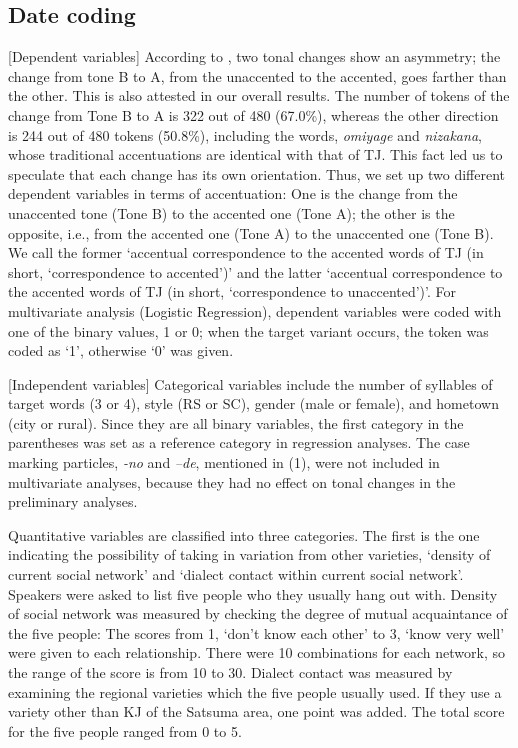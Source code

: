 \documentclass[output=paper]{LSP/langsci}
\begin{document}
\subsection{Date coding}
[Dependent variables] According to \citet{kubozono_tonal_2007}, two tonal changes show an asymmetry; the change from tone B to A, from the unaccented to the accented, goes farther than the other. This is also attested in our overall results. The number of tokens of the change from Tone B to A is 322 out of 480 (67.0\%), whereas the other direction is 244 out of 480 tokens (50.8\%), including the words, \textit{omiyage} and \textit{nizakana}, whose traditional accentuations are identical with that of TJ. This fact led us to speculate that each change has its own orientation. Thus, we set up two different dependent variables in terms of accentuation: One is the change from the unaccented tone (Tone B) to the accented one (Tone A); the other is the opposite, i.e., from the accented one (Tone A) to the unaccented one (Tone B). We call the former ‘accentual correspondence to the accented words of TJ (in short, ‘correspondence to accented’)’ and the latter ‘accentual correspondence to the accented words of TJ (in short, ‘correspondence to unaccented’)’. For multivariate analysis (Logistic Regression), dependent variables were coded with one of the binary values, 1 or 0; when the target variant occurs, the token was coded as ‘1’, otherwise ‘0’ was given.

[Independent variables] Categorical variables include the number of syllables of target words (3 or 4), style (RS or SC), gender (male or female), and hometown (city or rural). Since they are all binary variables, the first category in the parentheses was set as a reference category in regression analyses. The case marking particles, \textit{{}-no} and \textit{–de}, mentioned in (1), were not included in multivariate analyses, because they had no effect on tonal changes in the preliminary analyses.

Quantitative variables are classified into three categories. The first is the one indicating the possibility of taking in variation from other varieties, ‘density of current social network’ and ‘dialect contact within current social network’. Speakers were asked to list five people who they usually hang out with. Density of social network was measured by checking the degree of mutual acquaintance of the five people: The scores from 1, ‘don’t know each other’ to 3, ‘know very well’ were given to each relationship. There were 10 combinations for each network, so the range of the score is from 10 to 30. Dialect contact was measured by examining the regional varieties which the five people usually used. If they use a variety other than KJ of the Satsuma area, one point was added. The total score for the five people ranged from 0 to 5.
\end{document}
